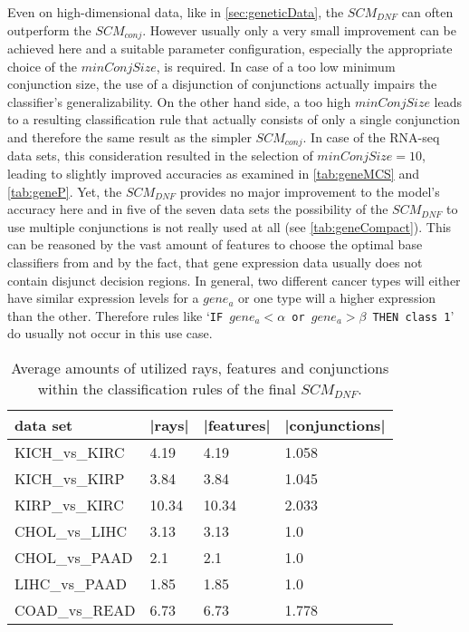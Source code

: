 Even on high-dimensional data, like in \autoref{sec:geneticData}, the \(SCM_{DNF}\) can often outperform the \(SCM_{conj}\).
However usually only a very small improvement can be achieved here and a suitable parameter 
configuration, especially the appropriate choice of the \(minConjSize\), is required.
In case of a too low minimum conjunction size, the use of a disjunction of conjunctions
actually impairs the classifier's generalizability.
On the other hand side, a too high \(minConjSize\) leads to a 
resulting classification rule that actually consists of only a single conjunction and
therefore the same result as the simpler \(SCM_{conj}\).
In case of the RNA-seq data sets, this consideration resulted in the selection of \(minConjSize = 10\),
leading to slightly improved accuracies as examined in \autoref{tab:geneMCS} and \autoref{tab:geneP}.
Yet, the \(SCM_{DNF}\) provides no major improvement to the model's accuracy here and in five
of the seven data sets the possibility of the \(SCM_{DNF}\) to use multiple conjunctions is
not really used at all (see \autoref{tab:geneCompact}).
This can be reasoned by the vast amount of features to choose the optimal base classifiers from and
by the fact, that gene expression data usually does not contain disjunct decision regions.
In general, two different cancer types will either have similar expression levels for a \(gene_a\)
or one type will a higher expression than the other.
Therefore rules like `\texttt{IF \(gene_a < \alpha\) or \(gene_a > \beta\) THEN class 1}' do usually not occur in this use case.

\begin{table}[ht]
    \centering
    \caption{Average amounts of utilized rays, features and conjunctions within the classification rules of the final \(SCM_{DNF}\).}\label{tab:geneCompact}
    \begin{tabular}{llll}
            \toprule
            data set & |rays| & |features| & |conjunctions| \\
            \midrule
            KICH\_vs\_KIRC & 4.19 & 4.19 & 1.058 \\
            KICH\_vs\_KIRP & 3.84 & 3.84 & 1.045 \\
            KIRP\_vs\_KIRC & 10.34 & 10.34 & 2.033 \\
            CHOL\_vs\_LIHC & 3.13 & 3.13 & 1.0 \\
            CHOL\_vs\_PAAD & 2.1 & 2.1 & 1.0 \\
            LIHC\_vs\_PAAD & 1.85 & 1.85 & 1.0 \\
            COAD\_vs\_READ & 6.73 & 6.73 & 1.778 \\
            \bottomrule
    \end{tabular}
\end{table}

